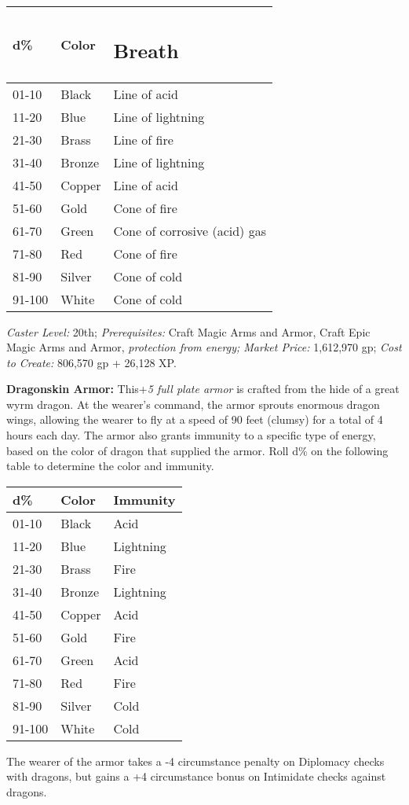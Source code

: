 \documentclass{article}
\begin{document}
\begin{tabular}{|>{\raggedright}p{36pt}|>{\raggedright}p{36pt}|>{\raggedright}p{111pt}|}
\hline
d\textbf{\%} & C\textbf{olor} & \subsection*{B\textbf{reath }}\tabularnewline
\hline
01-10 & Black & Line of acid\tabularnewline
\hline
11-20 & Blue & Line of lightning \tabularnewline
\hline
21-30 & Brass & Line of fire \tabularnewline
\hline
31-40 & Bronze & Line of lightning \tabularnewline
\hline
41-50 & Copper & Line of acid \tabularnewline
\hline
51-60 & Gold & Cone of fire \tabularnewline
\hline
61-70 & Green & Cone of corrosive (acid) gas \tabularnewline
\hline
71-80 & Red & Cone of fire \tabularnewline
\hline
81-90 & Silver & Cone of cold \tabularnewline
\hline
91-100 & White & Cone of cold \tabularnewline
\hline
\end{tabular}

\textit{Caster Level: }20th; \textit{Prerequisites: }Craft Magic Arms and Armor, 
Craft Epic Magic Arms and Armor, \textit{protection from energy; Market Price: 
}1,612,970 gp; \textit{Cost to Create: }806,570 gp + 26,128 XP. 

\textbf{Dragonskin Armor: }This+\textit{5 full plate armor }is crafted from the 
hide of a great wyrm dragon. At the wearer's command, the armor sprouts enormous 
dragon wings, allowing the wearer to fly at a speed of 90 feet (clumsy) for a total 
of 4 hours each day. The armor also grants immunity to a specific type of energy, 
based on the color of dragon that supplied the armor. Roll d\% on the following 
table to determine the color and immunity.

\begin{tabular}{|>{\raggedright}p{28pt}|>{\raggedright}p{28pt}|>{\raggedright}p{41pt}|}
\hline
d\textbf{\%} & C\textbf{olor} & I\textbf{mmunity}\tabularnewline
\hline
01-10 & Black & Acid\tabularnewline
\hline
11-20 & Blue & Lightning\tabularnewline
\hline
21-30 & Brass & Fire\tabularnewline
\hline
31-40 & Bronze & Lightning\tabularnewline
\hline
41-50 & Copper & Acid\tabularnewline
\hline
51-60 & Gold & Fire\tabularnewline
\hline
61-70 & Green & Acid\tabularnewline
\hline
71-80 & Red & Fire\tabularnewline
\hline
81-90 & Silver & Cold\tabularnewline
\hline
91-100 & White & Cold\tabularnewline
\hline
\end{tabular}

The wearer of the armor takes a -4 circumstance penalty on Diplomacy checks with 
dragons, but gains a +4 circumstance bonus on Intimidate checks against dragons. 
\end{document}
